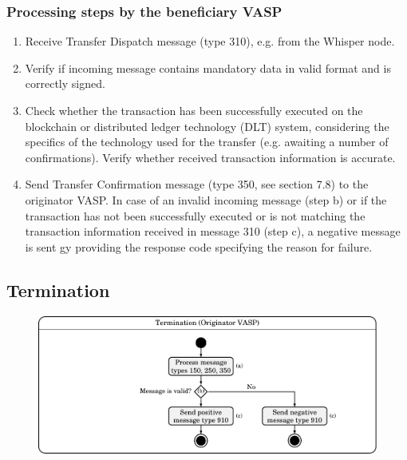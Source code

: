 \documentclass{article}
\begin{document}
\subsubsection{Processing steps by the beneficiary VASP}
\begin{enumerate}
    \item Receive Transfer Dispatch message (type 310), e.g. from the Whisper node.
    \item Verify if incoming message contains mandatory data in valid format and is correctly signed.
    \item Check whether the transaction has been successfully executed on the blockchain or distributed ledger technology (DLT) system, considering the specifics of the technology used for the transfer (e.g. awaiting a number of confirmations). Verify whether received transaction information is accurate.
    \item Send Transfer Confirmation message (type 350, see section 7.8) to the originator VASP. In case of an invalid incoming message (step b) or if the transaction has not been successfully executed or is not matching the transaction information received in message 310 (step c), a negative message is sent gy providing the response code specifying the reason for failure.
\end{enumerate}

\newpage
\subsection{Termination}
\begin{figure}[h]
    \centering
    \includegraphics[width=\textwidth]{g15.pdf}
\end{figure}
\end{document}
